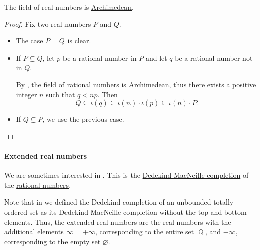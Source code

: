 \begin{proposition}\label{thm:real_numbers_archimedean}
  The field of real numbers is \hyperref[def:archimedean_field]{Archimedean}.
\end{proposition}
\begin{proof}
  Fix two real numbers \( P \) and \( Q \).

  \begin{itemize}
    \item The case \( P = Q \) is clear.

    \item If \( P \subsetneq Q \), let \( p \) be a rational number in \( P \) and let \( q \) be a rational number not in \( Q \).

    By , the field of rational numbers is Archimedean, thus there exists a positive integer \( n \) such that \( q < np \). Then
    \begin{equation*}
      Q \subseteq \iota(q) \subseteq \iota(n) \cdot \iota(p) \subseteq \iota(n) \cdot P.
    \end{equation*}

    \item If \( Q \subsetneq P \), we use the previous case.
  \end{itemize}
\end{proof}

\paragraph{Extended real numbers}

\begin{definition}\label{def:extended_real_numbers}\mimprovised
  We are sometimes interested in . This is the \hyperref[def:dedekind_macnielle_completion]{Dedekind-MacNeille completion} of the \hyperref[def:rational_numbers]{rational numbers}.
\end{definition}
\begin{comments}
  \item Note that in  we defined the Dedekind completion of an unbounded totally ordered set as its Dedekind-MacNeille completion without the top and bottom elements. Thus, the extended real numbers are the real numbers with the additional elements \( \infty = +\infty \), corresponding to the entire set \( \BbbQ \), and \( -\infty \), corresponding to the empty set \( \varnothing \).
\end{comments}

